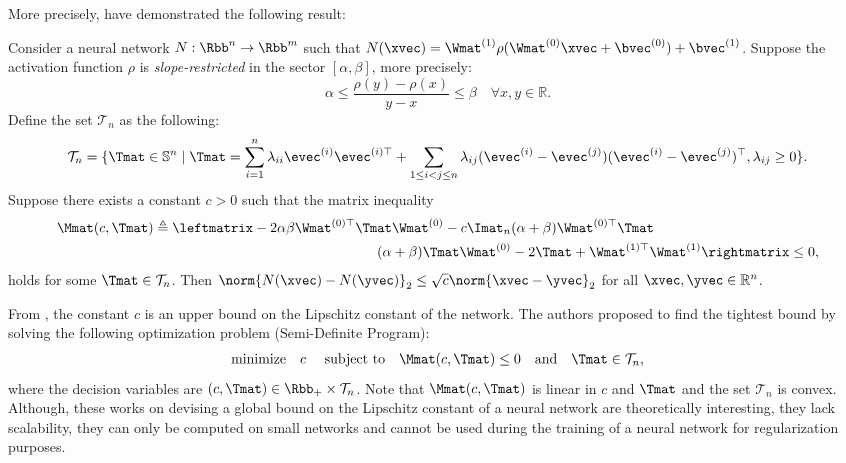 More precisely, \citet{fazlyab2019efficient} have demonstrated the following result:
\begin{theorem}
  Consider a neural network $N: \Rbb^n \rightarrow \Rbb^m$ such that $N(\xvec) = \Wmat^{(1)} \rho(\Wmat^{(0)} \xvec + \bvec^{(0)}) + \bvec^{(1)}$.
  Suppose the activation function $\rho$ is \emph{slope-restricted} in the sector $[\alpha,\beta]$, more precisely:
  \begin{equation}
    \alpha \leq \frac{\rho(y) - \rho(x)}{y-x} \leq \beta \quad \forall x,y \in \mathbb{R}. 
  \end{equation}
  Define the set $\mathcal{T}_{n}$ as the following:
  \begin{equation}
    \mathcal{T}_n = \{\Tmat \in \mathbb{S}^n \mid \Tmat = \sum_{i=1}^{n} \lambda_{ii} \evec^{(i)} \evec^{(i)\top} + \sum_{1 \leq i<j \leq n} \lambda_{ij}(\evec^{(i)} - \evec^{(j)})(\evec^{(i)}-\evec^{(j)})^\top, \lambda_{ij} \geq 0 \}.
  \end{equation}
  Suppose there exists a constant $c>0$ such that the matrix inequality
  \begin{align}
    \Mmat(c,\Tmat) \triangleq
      \leftmatrix
      -2\alpha \beta \Wmat^{(0)\top} \Tmat \Wmat^{(0)} - c \Imat_n & (\alpha+\beta) \Wmat^{(0)\top} \Tmat  \\
      (\alpha+\beta) \Tmat \Wmat^{(0)} & -2\Tmat+\Wmat^{(1)\top} \Wmat^{(1)}
      \rightmatrix
      \leq 0,
  \end{align}
  holds for some $\Tmat \in \mathcal{T}_{n}$. Then $\norm{N(\xvec)-N(\yvec)}_2 \leq \sqrt{c} \norm{\xvec-\yvec}_2$ for all  $\xvec,\yvec \in \mathbb{R}^n$.
  \label{theorem:ch3-lipschite_semidefinite_programming}
\end{theorem}
\noindent
From , the constant $c$ is an upper bound on the Lipschitz constant of the network.
The authors proposed to find the tightest bound by solving the following optimization problem (Semi-Definite Program):
\begin{align} \label{eq: SDP one layer}
  \textrm{minimize} \quad c \quad \text{ subject to} \quad \Mmat(c,\Tmat) \leq 0 \quad \text{and} \quad \Tmat \in \mathcal{T}_{n},
\end{align}
where the decision variables are $(c,\Tmat) \in \Rbb_+ \times \mathcal{T}_n$.
Note that $\Mmat(c,\Tmat)$ is linear in $c$ and $\Tmat$ and the set $\mathcal{T}_n$ is convex.
Although, these works on devising a global bound on the Lipschitz constant of a neural network are theoretically interesting, they lack scalability, they can only be computed on small networks and cannot be used during the training of a neural network for regularization purposes.

